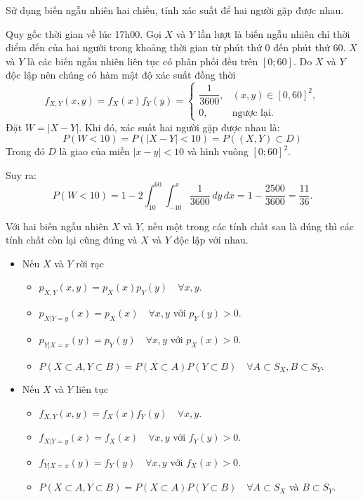 \documentclass[12pt,a4paper]{article}
\begin{document}
\begin{vidu}
Sử dụng biến ngẫu nhiên hai chiều, tính xác suất để hai người gặp được nhau.

Quy gốc thời gian về lúc 17h00. Gọi $X$ và $Y$ lần lượt là biến ngẫu nhiên chỉ thời điểm đến của hai người trong khoảng thời gian từ phút thứ 0 đến phút thứ 60. $X$ và $Y$ là các biến ngẫu nhiên liên tục có phân phối đều trên $[0; 60]$. Do $X$ và $Y$ độc lập nên chúng có hàm mật độ xác suất đồng thời
\[
  f_{X,Y}(x, y) = f_X(x)f_Y(y) = \begin{cases}
    \dfrac{1}{3600}, & (x, y) \in [0, 60]^2, \\
    0, & \text{ngược lại}.
  \end{cases}
\]
Đặt $W = |X - Y |$. Khi đó, xác suất hai người gặp được nhau là:
\[
  P(W < 10) = P (|X - Y | < 10) = P ((X, Y ) \subset D)
\]
Trong đó $D$ là giao của miền $|x - y| < 10$ và hình vuông $[0; 60]^2$.

Suy ra:
\[
  P(W < 10) = 1 - 2 \int_{10}^{60} \int_{-10}^{x} \dfrac{1}{3600} \, dy \, dx = 1 - \dfrac{2500}{3600} = \dfrac{11}{36}.
\]
\end{vidu}

\begin{dinhly}
Với hai biến ngẫu nhiên $X$ và $Y$, nếu một trong các tính chất sau là đúng thì các tính chất còn lại cũng đúng và $X$ và $Y$ độc lập với nhau.
\begin{itemize}
  \item Nếu $X$ và $Y$ rời rạc
  \begin{itemize}
    \item $p_{X,Y}(x, y) = p_X(x)p_Y(y) \quad \forall x, y$.
    \item $p_{X|Y =y}(x) = p_X(x) \quad \forall x, y$ với $p_Y(y) > 0$.
    \item $p_{Y|X=x}(y) = p_Y(y) \quad \forall x, y$ với $p_X(x) > 0$.
    \item $P(X \subset A, Y \subset B) = P(X \subset A)P(Y \subset B) \quad \forall A \subset S_X, B \subset S_Y$.
  \end{itemize}
  \item Nếu $X$ và $Y$ liên tục
  \begin{itemize}
    \item $f_{X,Y}(x, y) = f_X(x)f_Y(y) \quad \forall x, y$.
    \item $f_{X|Y =y}(x) = f_X(x) \quad \forall x, y$ với $f_Y(y) > 0$.
    \item $f_{Y|X=x}(y) = f_Y(y) \quad \forall x, y$ với $f_X(x) > 0$.
    \item $P(X \subset A, Y \subset B) = P(X \subset A)P(Y \subset B) \quad \forall A \subset S_X$ và $B \subset S_Y$.
  \end{itemize}
\end{itemize}
\end{dinhly}
\end{document}
